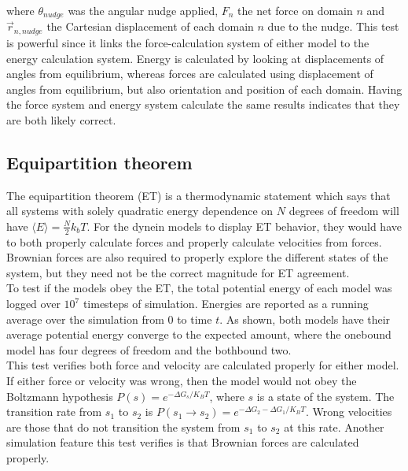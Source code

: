 \documentclass[
11pt, %
english, %
singlespacing, %
headsepline, %
chapterinoneline, %
]{MastersDoctoralThesis} %
\begin{document}
where $\theta_{nudge}$ was the angular nudge applied, $F_n$ the net force on domain $n$ and $\vec{r}_{n,nudge}$ the Cartesian displacement of each domain $n$ due to the nudge. This test is powerful since it links the force-calculation system of either model to the energy calculation system. Energy is calculated by looking at displacements of angles from equilibrium, whereas forces are calculated using displacement of angles from equilibrium, but also orientation and position of each domain. Having the force system and energy system calculate the same results indicates that they are both likely correct.\\

\subsection{Equipartition theorem}
The equipartition theorem (ET) is a thermodynamic statement which says that all systems with solely quadratic energy dependence on $N$ degrees of freedom will have $\langle E\rangle = \frac N2 k_bT$. For the dynein models to display ET behavior, they would have to both properly calculate forces and properly calculate velocities from forces. Brownian forces are also required to properly explore the different states of the system, but they need not be the correct magnitude for ET agreement.\\

To test if the models obey the ET, the total potential energy of each model was logged over $10^7$ timesteps of simulation. Energies are reported as a running average over the simulation from 0 to time $t$. As shown, both models have their average potential energy converge to the expected amount, where the onebound model has four degrees of freedom and the bothbound two.\\

This test verifies both force and velocity are calculated properly for either model. If either force or velocity was wrong, then the model would not obey the Boltzmann hypothesis $P(s) = e^{-\Delta G_{s}/K_BT}$, where $s$ is a state of the system. The transition rate from $s_1$ to $s_2$ is $P(s_1\rightarrow s_2) = e^{-{\Delta G_2 - \Delta G_1}/K_BT}$. Wrong velocities are those that do not transition the system from $s_1$ to $s_2$ at this rate. Another simulation feature this test verifies is that Brownian forces are calculated properly.\\
\end{document}
